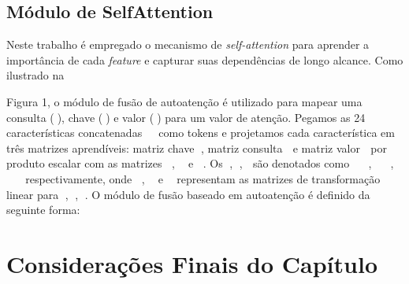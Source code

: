 \subsection{Módulo de SelfAttention}
\label{subsec:cap4_mod_self_attention}

Neste trabalho é empregado o mecanismo de \textit{self-attention} para aprender a importância de cada \textit{feature} e capturar suas dependências de longo alcance. Como ilustrado na 


Figura 1, o módulo de fusão de autoatenção é utilizado para mapear uma consulta (), chave () e valor () para um valor de atenção. Pegamos as 24 características concatenadas  como tokens e projetamos cada característica em três matrizes aprendíveis: matriz chave , matriz consulta  e matriz valor  por produto escalar com as matrizes ,  e . Os , ,  são denotados como , ,  respectivamente, onde ,  e  representam as matrizes de transformação linear para , , . O módulo de fusão baseado em autoatenção é definido da seguinte forma:




\section{Considerações Finais do Capítulo}
\label{sec:cap4_consideracoes_finais}

\lipsum[1-4]